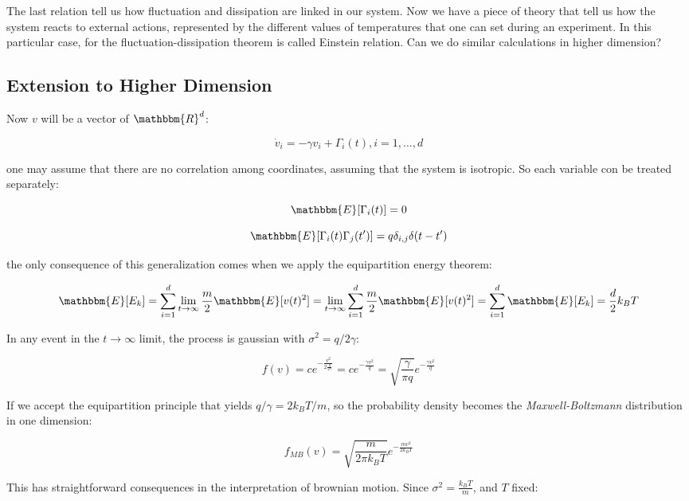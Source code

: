 \documentclass{article}
\begin{document}
The last relation tell us how fluctuation and dissipation are linked in our system. Now we have a piece of theory that tell us how the system reacts to external actions, represented by the different values of temperatures that one can set during an experiment. In this particular case, for the fluctuation-dissipation theorem is called Einstein relation. Can we do similar calculations in higher dimension?
 
\subsection{Extension to Higher Dimension} 

Now $v$ will be a vector of $\mathbbm{R}^d$:

$$ \dot{v}_i = -\gamma v_i + \Gamma_i(t), i=1,...,d$$

one may assume that there are no correlation among coordinates, assuming that the system is isotropic. So each variable con be treated separately:

$$ \mathbbm{E}[\Gamma_i(t)] = 0$$

$$ \mathbbm{E}[\Gamma_i(t)\Gamma_j(t')] = q \delta_{i,j} \delta(t-t') $$

the only consequence of this generalization comes when we apply the equipartition energy theorem:

$$ \mathbbm{E}[E_k] = \sum_{i=1}^{d} \lim\limits_{t \to \infty} \frac{m}{2} \mathbbm{E}[v(t)^2] =  \lim\limits_{t \to \infty} \sum_{i=1}^{d} \frac{m}{2} \mathbbm{E}[v(t)^2] =  \sum_{i=1}^{d} \mathbbm{E}[E_k] = \frac{d}{2} k_B T $$

In any event in the $t \to \infty $ limit, the process is gaussian with $ \sigma^2 = q / 2 \gamma$:

$$ f(v) = c e^{- \frac{v^2}{2 \frac{q}{2 \gamma} } } = c e^{- \frac{\gamma v^2}{q}} = \sqrt{ \frac{\gamma}{\pi q}} e^{- \frac{\gamma v^2}{q}} $$

If we accept the equipartition principle that yields $q / \gamma = 2 k_B T / m $, so the probability density becomes the \textit{Maxwell-Boltzmann} distribution in one dimension:

\begin{equation}
f_{MB} (v) = \sqrt{ \frac{m}{2 \pi k_B T}} e^{- \frac{ m v^2}{2k _B T}}
\end{equation}

This has straightforward consequences in the interpretation of brownian motion. Since $ \sigma^2 = \frac{k_B T}{m}$, and $T$ fixed:
\end{document}
